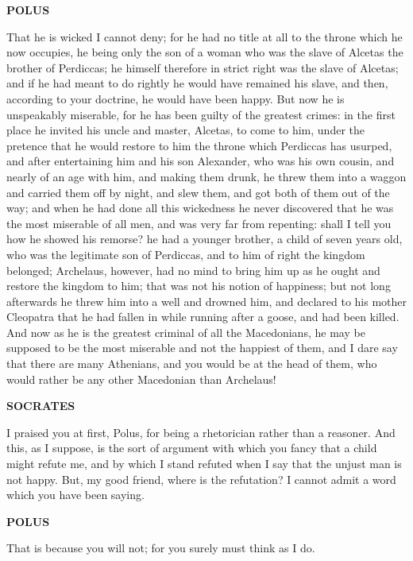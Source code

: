\documentclass[11pt,letter]{article}
\begin{document}
\par \textbf{POLUS}
\par   That he is wicked I cannot deny; for he had no title at all to the throne which he now occupies, he being only the son of a woman who was the slave of Alcetas the brother of Perdiccas; he himself therefore in strict right was the slave of Alcetas; and if he had meant to do rightly he would have remained his slave, and then, according to your doctrine, he would have been happy. But now he is unspeakably miserable, for he has been guilty of the greatest crimes:  in the first place he invited his uncle and master, Alcetas, to come to him, under the pretence that he would restore to him the throne which Perdiccas has usurped, and after entertaining him and his son Alexander, who was his own cousin, and nearly of an age with him, and making them drunk, he threw them into a waggon and carried them off by night, and slew them, and got both of them out of the way; and when he had done all this wickedness he never discovered that he was the most miserable of all men, and was very far from repenting:  shall I tell you how he showed his remorse? he had a younger brother, a child of seven years old, who was the legitimate son of Perdiccas, and to him of right the kingdom belonged; Archelaus, however, had no mind to bring him up as he ought and restore the kingdom to him; that was not his notion of happiness; but not long afterwards he threw him into a well and drowned him, and declared to his mother Cleopatra that he had fallen in while running after a goose, and had been killed. And now as he is the greatest criminal of all the Macedonians, he may be supposed to be the most miserable and not the happiest of them, and I dare say that there are many Athenians, and you would be at the head of them, who would rather be any other Macedonian than Archelaus!

\par \textbf{SOCRATES}
\par   I praised you at first, Polus, for being a rhetorician rather than a reasoner. And this, as I suppose, is the sort of argument with which you fancy that a child might refute me, and by which I stand refuted when I say that the unjust man is not happy. But, my good friend, where is the refutation? I cannot admit a word which you have been saying.

\par \textbf{POLUS}
\par   That is because you will not; for you surely must think as I do.
\end{document}
